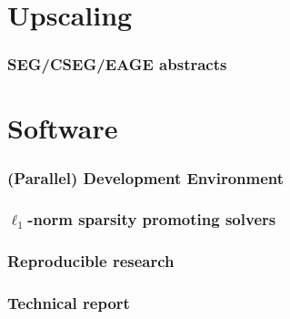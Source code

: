 \documentclass{article}
\begin{document}
\section*{Upscaling}



\subsubsection*{SEG/CSEG/EAGE abstracts}
\noindent
{}

\section*{Software}
\label{sec:software}

\subsubsection*{(Parallel) Development Environment}
\label{sec:parall-curv-transf}

\noindent
{} 
\noindent
{} 
\noindent
{} 

\subsubsection*{$\ell_1$-norm sparsity promoting solvers}
\label{sec:ell_1-solvers}

\noindent
{} 
\noindent
{}

\subsubsection*{Reproducible research}
\label{sec:repr-rese}

\subsubsection*{Technical report}
\label{sec:technical-report}

\noindent
{}
\end{document}
